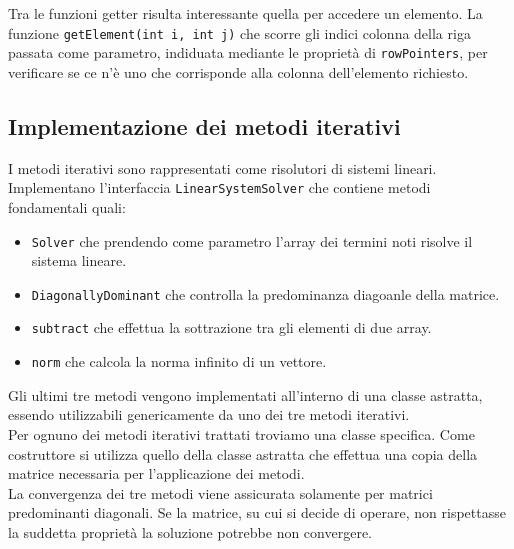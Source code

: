 \documentclass[12pt]{article}
\begin{document}
Tra le funzioni getter risulta interessante quella per accedere un elemento. La funzione \texttt{getElement(int i, int j)} che scorre gli indici colonna della riga passata come parametro, indiduata mediante le proprietà di \texttt{rowPointers}, per verificare se ce n'è uno che corrisponde alla colonna dell'elemento richiesto.

\subsection{Implementazione dei metodi iterativi}
I metodi iterativi sono rappresentati come risolutori di sistemi lineari. Implementano l'interfaccia \texttt{LinearSystemSolver} che contiene metodi fondamentali quali:
\begin{itemize}
    \item \texttt{Solver} che prendendo come parametro l'array dei termini noti risolve il sistema lineare.
    \item \texttt{DiagonallyDominant} che controlla la predominanza diagoanle della matrice.
    \item \texttt{subtract} che effettua la sottrazione tra gli elementi di due array.
    \item \texttt{norm} che calcola la norma infinito di un vettore.
\end{itemize}

Gli ultimi tre metodi vengono implementati all'interno di una classe astratta, essendo utilizzabili genericamente da uno dei tre metodi iterativi.\\

Per ognuno dei metodi iterativi trattati troviamo una classe specifica. Come costruttore si utilizza quello della classe astratta che effettua una copia della matrice necessaria per l'applicazione dei metodi.\\
La convergenza dei tre metodi viene assicurata solamente per matrici predominanti diagonali. Se la matrice, su cui si decide di operare, non rispettasse la suddetta proprietà la soluzione potrebbe non convergere.
\end{document}

